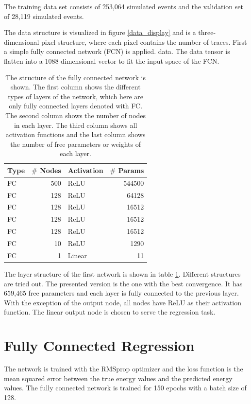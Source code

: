 \documentclass[12pt, a4paper]{thesis}
\begin{document}
The training data set consists of 253,064 simulated events and the
validation set of 28,119 simulated events.

The data structure is visualized in figure \ref{data_display} and is a
three-dimensional pixel structure, where each pixel contains the
number of traces. First a simple fully connected network (FCN) is
applied. %
data. The data tensor is flatten into a 1088 dimensional
  vector to fit the input space of the FCN.

\begin{table}[hbtp]
  \centering
  \begin{tabular}{lrlr}
    Type & \(\#\) Nodes & Activation & \(\#\) Params\\
    \hline
    FC & 500 & ReLU & 544500\\
    FC & 128 & ReLU & 64128\\
    FC & 128 & ReLU & 16512\\
    FC & 128 & ReLU & 16512\\
    FC & 128 & ReLU & 16512\\
    FC & 10 & ReLU & 1290\\
    FC & 1 & Linear & 11\\
  \end{tabular}
  \caption{The structure of the fully connected network is shown. The
    first column shows the different types of layers of the network,
    which here are only fully connected layers denoted with
      FC. The second column shows the number of nodes in each
    layer. The third column shows all activation functions and the
    last column shows the number of free parameters or weights of each
    layer.}
  \label{fcn_structure}
\end{table}

The layer structure of the first network is shown in table
\ref{fcn_structure}.  Different structures are tried out. The
  presented version is the one with the best convergence. It has
659,465 free parameters and each layer is fully connected to
  the previous layer. With the exception of the output node, all
nodes have ReLU as their activation function. The linear output
  node is chosen to serve the regression task.

\section{Fully Connected Regression}
\label{sec:orgdf3234b}

The network is trained with the RMSprop optimizer and the loss
function is the mean squared error between the true energy values and
the predicted energy values. The fully connected network is trained
for 150 epochs with a batch size of 128.
\end{document}

